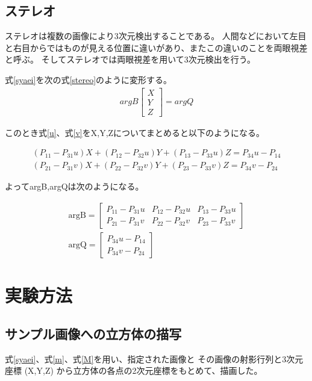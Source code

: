 \documentclass[11pt,a4j]{jsarticle}
\begin{document}
\subsection{ステレオ}
\label{sub:ステレオ}
ステレオは複数の画像により3次元検出することである。
人間などにおいて左目と右目からではものが見える位置に違いがあり、またこの違いのことを両眼視差と呼ぶ。
そしてステレオでは両眼視差を用いて3次元検出を行う。

式\ref{syaei}を次の式\ref{stereo}のように変形する。
\begin{align}
  argB
  \left[
    \begin{array}{c}
      X \\ Y \\ Z
    \end{array}
  \right]
  = argQ
  \label{stereo}
\end{align}

このとき式\ref{u}、式\ref{v}をX,Y,Zについてまとめると以下のようになる。

\begin{align}
  (P_{11} - P_{31}u)X + (P_{12} - P_{32}u)Y + (P_{13} - P_{33}u)Z = P_{34}u - P_{14}
  \label{u3} \\
  (P_{21} - P_{31}v)X + (P_{22} - P_{32}v)Y + (P_{23} - P_{33}v)Z = P_{34}v - P_{24}
  \label{v3}
\end{align}

よってargB,argQは次のようになる。

\begin{align}
  \mathrm{argB} =
  \left[
    \begin{array}{ccc}
      P_{11} - P_{31}u & P_{12} - P_{32}u & P_{13} - P_{33}u \\
      P_{21} - P_{31}v & P_{22} - P_{32}v & P_{23} - P_{33}v
    \end{array}
  \right]
  \label{argB} \\[0.5cm]
  \mathrm{argQ} =
  \left[
    \begin{array}{c}
      P_{34}u - P_{14} \\
      P_{34}v - P_{24}
    \end{array}
  \right]
  \label{argB}
\end{align}

\section{実験方法}
\label{sec:実験方法}

\subsection{サンプル画像への立方体の描写}
\label{sub:サンプル画像への立方体の描写}
式\ref{syaei}、式\ref{m}、式\ref{M}を用い、指定された画像と
その画像の射影行列と3次元座標 (X,Y,Z) から立方体の各点の2次元座標をもとめて、描画した。
\end{document}
